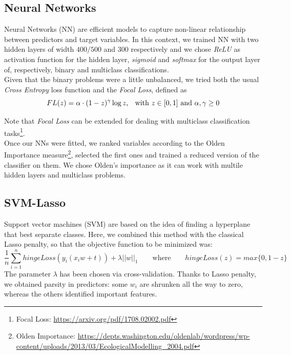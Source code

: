 \documentclass[a4paper,11pt, oneside]{article}  %
\begin{document}
\subsection{Neural Networks}
Neural Networks (NN) are efficient models to capture non-linear relationship between predictors and target variables. In this context, we trained NN with two hidden layers of width $400/500$ and $300$ respectively and we chose \textit{ReLU} as activation function for the hidden layer, \textit{sigmoid} and \textit{softmax} for the output layer of, respectively, binary and multiclass classifications. \\
Given that the binary problems were a little unbalanced, we tried both the usual \textit{Cross Entropy} loss function and the \textit{Focal Loss}, defined as 
\begin{equation*}
FL(z) = \alpha \cdot (1 - z)^{\gamma} \log{z} \text{,  \hspace{3pt} with }z \in [0,1]  \text{ and } \alpha,  \gamma \geq 0
\end{equation*}

Note that \textit{Focal Loss} can be extended for dealing with multiclass classification tasks\footnote{Focal Loss: \url{https://arxiv.org/pdf/1708.02002.pdf}}. \\
Once our NNs were fitted,  we ranked variables according to the Olden Importance measure\footnote{Olden Importance: \url{https://depts.washington.edu/oldenlab/wordpress/wp-content/uploads/2013/03/EcologicalModelling_2004.pdf}}, selected the first ones and trained a reduced version of the classifier on them. We chose Olden's importance as it can work with multile hidden layers and multiclass problems. 

\subsection{SVM-Lasso}
Support vector machines (SVM) are based on the idea of finding a hyperplane that best separate classes. Here, we combined this method with the classical Lasso penalty, so that the objective function to be minimized was:
\begin{equation*}
\dfrac{1}{n} \sum_{i=1}^n hingeLoss(y_i(x_i w + t)) + \lambda ||w||_1  \qquad	\text{where} \qquad  hingeLoss(z) = max\{0, 1-z\}
\end{equation*}
The parameter $\lambda$ has been chosen via cross-validation. Thanks to Lasso penalty, we obtained parsity in predictors: some $w_i$ are shrunken all the way to zero, whereas the others identified important features. 
\end{document}
